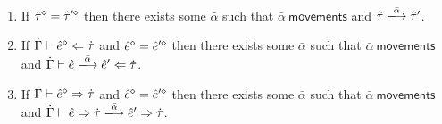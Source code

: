 \begin{theorem}[Reachability]\label{thrm:reachability} ~
\begin{enumerate}[itemsep=0px,partopsep=0px,topsep=0px]
\item If $\hat{\tau}^{\diamond}=\hat{\tau}'^{\diamond}$ then there exists some $\bar\alpha$ such that $\bar{\alpha}~\mathsf{movements}$ and $\performTyp{\ztau}{\bar\alpha}{\ztau'}$.
\item If $\dot{\Gamma} \vdash \hat{e}^{\diamond} \Leftarrow \dot{\tau}$ and $\hat{e}^{\diamond}=\hat{e}'^{\diamond}$ then there exists some $\bar{\alpha}$ such that $\bar{\alpha}~\mathsf{movements}$ and $\performAna{\hGamma}{\zexp}{\htau}{\bar{\alpha}}{\zexp'}$. 
\item If $\dot{\Gamma} \vdash \hat{e}^{\diamond} \Rightarrow \dot{\tau}$ and $\hat{e}^{\diamond}=\hat{e}'^{\diamond}$ then there exists some $\bar{\alpha}$ such that $\bar{\alpha}~\mathsf{movements}$ and $\performSyn{\hGamma}{\zexp}{\htau}{\bar\alpha}{\zexp'}{\htau}$.
\end{enumerate}
\end{theorem}

